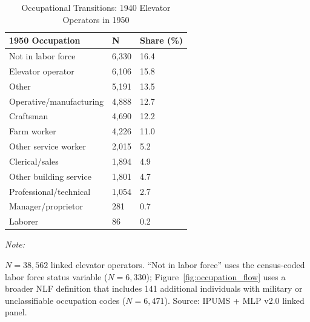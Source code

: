 \begin{table}[!h]
\centering
\caption{Occupational Transitions: 1940 Elevator Operators in 1950}
\label{tab:transition_matrix}
\centering
\begin{threeparttable}
\begin{tabular}[t]{lll}
\toprule
1950 Occupation & N & Share (\%)\\
\midrule
Not in labor force & 6,330 & 16.4\\
Elevator operator & 6,106 & 15.8\\
Other & 5,191 & 13.5\\
Operative/manufacturing & 4,888 & 12.7\\
Craftsman & 4,690 & 12.2\\
\addlinespace
Farm worker & 4,226 & 11.0\\
Other service worker & 2,015 & 5.2\\
Clerical/sales & 1,894 & 4.9\\
Other building service & 1,801 & 4.7\\
Professional/technical & 1,054 & 2.7\\
\addlinespace
Manager/proprietor & 281 & 0.7\\
Laborer & 86 & 0.2\\
\bottomrule
\end{tabular}
\begin{tablenotes}
\item \textit{Note: }
\item $N = 38{,}562$ linked elevator operators. ``Not in labor force'' uses the census-coded labor force status variable ($N = 6{,}330$); Figure~\ref{fig:occupation_flow} uses a broader NLF definition that includes 141 additional individuals with military or unclassifiable occupation codes ($N = 6{,}471$). Source: IPUMS + MLP v2.0 linked panel.
\end{tablenotes}
\end{threeparttable}
\end{table}
